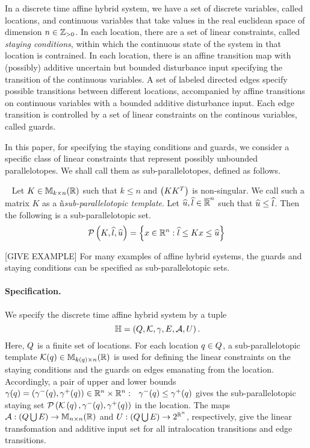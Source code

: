 
In a discrete time affine hybrid system, we have a set of
discrete variables, called locations, and continuous
variables that take values in the real euclidean space of dimension
$n\in\mathbb{Z}_{> 0}$.  In each location, there are a set
of linear constraints, called \emph{staying conditions}, within which
the continuous state of the system in that location is contrained.
In each location, there is an affine transition map with (possibly)
additive uncertain but bounded disturbance input specifying the
transition of the continuous variables.  A set of labeled directed
edges specify possible transitions between different locations,
accompanied by affine transitions on continuous variables with a bounded
additive disturbance input.  Each edge transition is controlled by a
set of linear constraints on the continous variables, called guards.

In this paper, for specifying the staying conditions and guards, we consider a
specific class of linear constraints that represent possibly
unbounded parallelotopes.  We shall call them as
sub-parallelotopes, defined as follows.
%
\begin{definition}~\label{defn:sub-parallelotope} Let
  $K\in\mathbb{M}_{k\times n}(\mathbb{R})$ such that $k\leq n$ and $\left(KK^T\right)$ is
  non-singular.  We call such a matrix $K$ as a
  ñ\emph{sub-parallelotopic template}.  Let
  $\widehat{u},\widehat{l}\in\mathbb{\overline{R}}^n$ such that $\widehat{u}\leq\widehat{l}$.  Then
  the following is a sub-parallelotopic set.
\[
\mathcal{P}\left(K,\widehat{l},\widehat{u}\right) = \left\{x\in\mathbb{R}^n: \widehat{l}\leq Kx \leq \widehat{u}\right\}
\]
\end{definition}
%
[GIVE EXAMPLE] For many examples of affine hybrid systems, the guards
and staying conditions can be specified as sub-parallelotopic sets. 


\paragraph{Specification.}
We specify the discrete time affine hybrid system by a tuple 
%
\begin{equation}~\label{eqn:system}
\mathbb{H} =
\left(Q,\mathcal{K},\gamma,E,\mathcal{A},U\right).
\end{equation}
%
Here, $Q$ is a finite set of locations.  For each location
$q\in Q$, a sub-parallelotopic template
$\mathcal{K}(q)\in\mathbb{M}_{k(q)\times n}(\mathbb{\mathbb{R}})$ is used for defining the
linear constraints on the staying conditions and the guards on edges
emanating from the location.  Accordingly, a pair of upper and lower
bounds
$\gamma(q)=\left(\gamma^-(q),\gamma^+(q)\right)\in\mathbb{R}^n\times\mathbb{R}^n:
~~\gamma^-(q)\leq\gamma^+(q)$ gives the sub-parallelotopic
staying set
$\mathcal{P}\left(\mathcal{K}\left(q\right),\gamma^-(q),\gamma^+(q)\right)$ in the
location.  The maps
$\mathcal{A}:\left(Q\bigcup E\right)\rightarrow\mathbb{M}_{n\times n}(\mathbb{R})$
and $U:\left(Q\bigcup E\right)\rightarrow 2^{\mathbb{R}^n}$,
respectively, give the linear transfomation and additive input set for
all intralocation transitions and edge transitions.

